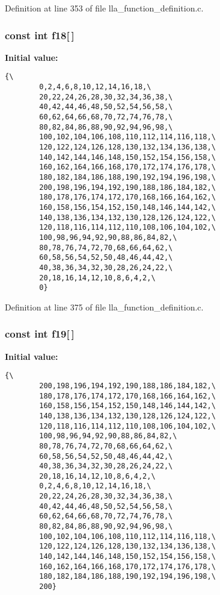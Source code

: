 Definition at line 353 of file lla\_\-function\_\-definition.c.
\subsubsection{\setlength{\rightskip}{0pt plus 5cm}const int {\bf f18}[$\,$]}\label{lla__function__definition_8c_a17}


{\bf Initial value:}

\footnotesize\begin{verbatim}{\
        0,2,4,6,8,10,12,14,16,18,\
        20,22,24,26,28,30,32,34,36,38,\
        40,42,44,46,48,50,52,54,56,58,\
        60,62,64,66,68,70,72,74,76,78,\
        80,82,84,86,88,90,92,94,96,98,\
        100,102,104,106,108,110,112,114,116,118,\
        120,122,124,126,128,130,132,134,136,138,\
        140,142,144,146,148,150,152,154,156,158,\
        160,162,164,166,168,170,172,174,176,178,\
        180,182,184,186,188,190,192,194,196,198,\
        200,198,196,194,192,190,188,186,184,182,\
        180,178,176,174,172,170,168,166,164,162,\
        160,158,156,154,152,150,148,146,144,142,\
        140,138,136,134,132,130,128,126,124,122,\
        120,118,116,114,112,110,108,106,104,102,\
        100,98,96,94,92,90,88,86,84,82,\
        80,78,76,74,72,70,68,66,64,62,\
        60,58,56,54,52,50,48,46,44,42,\
        40,38,36,34,32,30,28,26,24,22,\
        20,18,16,14,12,10,8,6,4,2,\
        0}
\end{verbatim}\normalsize 


Definition at line 375 of file lla\_\-function\_\-definition.c.
\subsubsection{\setlength{\rightskip}{0pt plus 5cm}const int {\bf f19}[$\,$]}\label{lla__function__definition_8c_a18}


{\bf Initial value:}

\footnotesize\begin{verbatim}{\
        200,198,196,194,192,190,188,186,184,182,\
        180,178,176,174,172,170,168,166,164,162,\
        160,158,156,154,152,150,148,146,144,142,\
        140,138,136,134,132,130,128,126,124,122,\
        120,118,116,114,112,110,108,106,104,102,\
        100,98,96,94,92,90,88,86,84,82,\
        80,78,76,74,72,70,68,66,64,62,\
        60,58,56,54,52,50,48,46,44,42,\
        40,38,36,34,32,30,28,26,24,22,\
        20,18,16,14,12,10,8,6,4,2,\
        0,2,4,6,8,10,12,14,16,18,\
        20,22,24,26,28,30,32,34,36,38,\
        40,42,44,46,48,50,52,54,56,58,\
        60,62,64,66,68,70,72,74,76,78,\
        80,82,84,86,88,90,92,94,96,98,\
        100,102,104,106,108,110,112,114,116,118,\
        120,122,124,126,128,130,132,134,136,138,\
        140,142,144,146,148,150,152,154,156,158,\
        160,162,164,166,168,170,172,174,176,178,\
        180,182,184,186,188,190,192,194,196,198,\
        200}
\end{verbatim}\normalsize 


